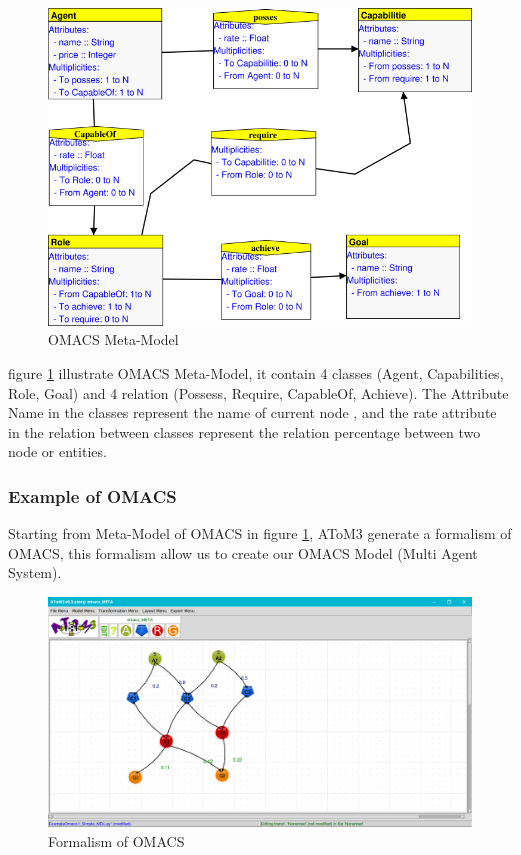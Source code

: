 \begin{figure}[th]
	\centering
 	\includegraphics[scale=0.7]{ch3/img/omacs_meta}
	\caption{\label{fig:OMACS Meta-Model}OMACS Meta-Model}
\end{figure} 
\vspace{0.9cm}
figure \ref{fig:OMACS Meta-Model} illustrate OMACS Meta-Model,  it contain 4 classes (Agent, Capabilities, Role, Goal) 
and 4 relation (Possess, Require, CapableOf, Achieve). 
The Attribute Name in the classes represent the name of current node ,
and the rate attribute in the relation between classes represent the relation percentage between two node or entities.

\pagebreak
\subsubsection{Example of OMACS}

Starting from Meta-Model of OMACS in figure \ref{fig:OMACS Meta-Model}, AToM3 generate a formalism of OMACS, this formalism allow us to create our OMACS Model (Multi Agent System).
\vspace{0.1cm}
\begin{figure}[th]
	\centering
 	\includegraphics[scale=0.3]{ch3/img/omacs_model}
	\caption{\label{fig:OMACS Model}Formalism of OMACS}
\end{figure} 

